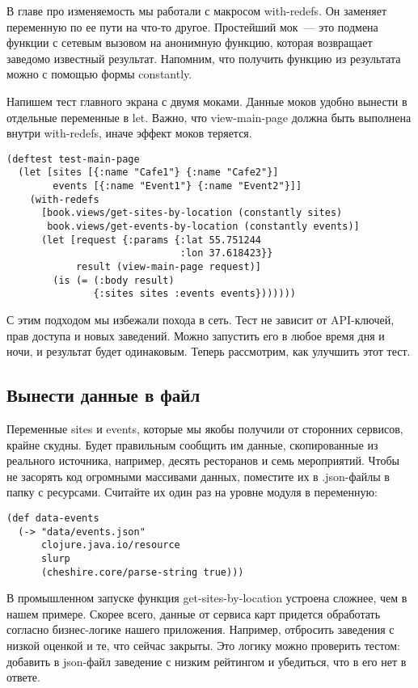 В главе про изменяемость мы работали с макросом with-redefs. Он заменяет
переменную по ее пути на что-то другое. Простейший мок~--- это подмена функции с
сетевым вызовом на анонимную функцию, которая возвращает заведомо известный
результат. Напомним, что получить функцию из результата можно с помощью формы
constantly.

Напишем тест главного экрана с двумя моками. Данные моков удобно вынести в
отдельные переменные в let. Важно, что view-main-page должна быть выполнена
внутри with-redefs, иначе эффект моков теряется.

\begin{verbatim}
(deftest test-main-page
  (let [sites [{:name "Cafe1"} {:name "Cafe2"}]
        events [{:name "Event1"} {:name "Event2"}]]
    (with-redefs
      [book.views/get-sites-by-location (constantly sites)
       book.views/get-events-by-location (constantly events)]
      (let [request {:params {:lat 55.751244
                              :lon 37.618423}}
            result (view-main-page request)]
        (is (= (:body result)
               {:sites sites :events events}))))))
\end{verbatim}

С этим подходом мы избежали похода в сеть. Тест не зависит от API-ключей, прав
доступа и новых заведений. Можно запустить его в любое время дня и ночи, и
результат будет одинаковым. Теперь рассмотрим, как улучшить этот тест.

\subsection{Вынести данные в файл}

Переменные sites и events, которые мы якобы получили от сторонних сервисов,
крайне скудны. Будет правильным сообщить им данные, скопированные из реального
источника, например, десять ресторанов и семь мероприятий. Чтобы не засорять код
огромными массивами данных, поместите их в .json-файлы в папку с
ресурсами. Считайте их один раз на уровне модуля в переменную:

\begin{verbatim}
(def data-events
  (-> "data/events.json"
      clojure.java.io/resource
      slurp
      (cheshire.core/parse-string true)))
\end{verbatim}

В промышленном запуске функция get-sites-by-location устроена сложнее, чем в
нашем примере. Скорее всего, данные от сервиса карт придется обработать согласно
бизнес-логике нашего приложения. Например, отбросить заведения с низкой оценкой
и те, что сейчас закрыты. Это логику можно проверить тестом: добавить в
json-файл заведение с низким рейтингом и убедиться, что в его нет в ответе.

